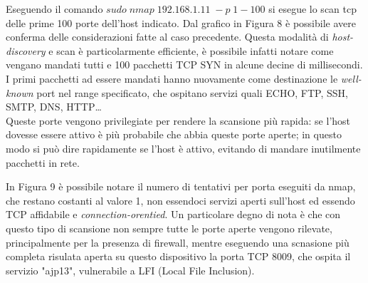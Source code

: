 \documentclass{article}
\begin{document}
Eseguendo il comando  $sudo\; nmap \;192.168.1.11\; -p \; 1-100$ si esegue lo scan tcp delle 
prime 100 porte dell'host indicato. Dal grafico in Figura 8 è possibile avere conferma delle 
considerazioni fatte al caso precedente. Questa modalità di \textit{host-discovery} e scan è particolarmente
efficiente, è possibile infatti notare come vengano mandati tutti e 100 pacchetti TCP SYN in alcune decine 
di millisecondi. I primi pacchetti ad essere mandati hanno nuovamente come destinazione le 
\textit{well-known} port nel range specificato, che ospitano servizi quali ECHO, FTP, SSH, SMTP, DNS, HTTP\dots \\
Queste porte vengono privilegiate per rendere la scansione più rapida: se l'host dovesse essere attivo è più probabile
che abbia queste porte aperte; in questo modo si può dire rapidamente se l'host è attivo, evitando di mandare inutilmente 
pacchetti in rete. 


In Figura 9 è possibile notare il numero di tentativi per porta eseguiti da nmap, che restano costanti 
al valore 1, non essendoci servizi aperti sull'host ed essendo TCP affidabile e \textit{connection-orentied}. 
Un particolare degno di nota è che con questo tipo di scansione non sempre tutte le porte aperte vengono rilevate,
principalmente per la presenza di firewall, mentre eseguendo una scnasione più completa risulata aperta su questo dispositivo
la porta TCP 8009, che ospita il servizio "ajp13", vulnerabile a LFI (Local File Inclusion).
\end{document}
